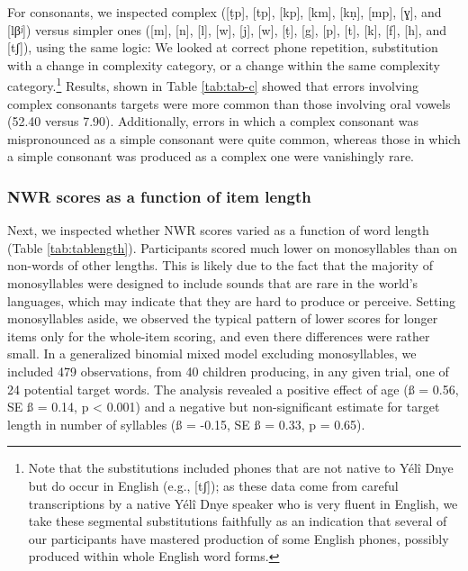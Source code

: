 \documentclass[english,,man,floatsintext]{apa6}
\begin{document}
For consonants, we inspected complex ({[}ṭp{]}, {[}tp{]}, {[}kp{]}, {[}km{]}, {[}kṇ{]}, {[}mp{]}, {[}ɣ{]}, and {[}lβʲ{]}) versus simpler ones ({[}m{]}, {[}n{]}, {[}l{]}, {[}w{]}, {[}j{]}, {[}w{]}, {[}ṭ{]}, {[}g{]}, {[}p{]}, {[}t{]}, {[}k{]}, {[}f{]}, {[}h{]}, and {[}tʃ{]}), using the same logic: We looked at correct phone repetition, substitution with a change in complexity category, or a change within the same complexity category.\footnote{Note that the substitutions included phones that are not native to Yélî Dnye but do occur in English (e.g., {[}tʃ{]}); as these data come from careful transcriptions by a native Yélî Dnye speaker who is very fluent in English, we take these segmental substitutions faithfully as an indication that several of our participants have mastered production of some English phones, possibly produced within whole English word forms.} Results, shown in Table \ref{tab:tab-c} showed that errors involving complex consonants targets were more common than those involving oral vowels (52.40 versus 7.90). Additionally, errors in which a complex consonant was mispronounced as a simple consonant were quite common, whereas those in which a simple consonant was produced as a complex one were vanishingly rare.

\hypertarget{nwr-scores-as-a-function-of-item-length}{%
\subsubsection{NWR scores as a function of item length}\label{nwr-scores-as-a-function-of-item-length}}

Next, we inspected whether NWR scores varied as a function of word length (Table \ref{tab:tablength}). Participants scored much lower on monosyllables than on non-words of other lengths. This is likely due to the fact that the majority of monosyllables were designed to include sounds that are rare in the world's languages, which may indicate that they are hard to produce or perceive. Setting monosyllables aside, we observed the typical pattern of lower scores for longer items only for the whole-item scoring, and even there differences were rather small. In a generalized binomial mixed model excluding monosyllables, we included 479 observations, from 40 children producing, in any given trial, one of 24 potential target words. The analysis revealed a positive effect of age (ß = 0.56, SE ß = 0.14, p \textless{} 0.001) and a negative but non-significant estimate for target length in number of syllables (ß = -0.15, SE ß = 0.33, p = 0.65).
\end{document}
